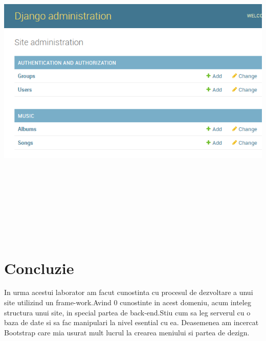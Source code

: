 \documentclass[a4paper, 12pt]{article}
\begin{document}
\includegraphics*[width=15cm, height=16cm]{admin}

\newpage
\section{Concluzie}
In urma acestui laborator am facut cunostinta cu procesul de dezvoltare a unui site utilizind un frame-work.Avind 0 cunostinte in acest domeniu, acum inteleg structura unui site, in special partea de back-end.Stiu cum sa leg serverul cu o baza de date si sa fac manipulari la nivel esential cu ea.
Deasemenea am incercat Bootstrap care mia usurat mult lucrul la crearea meniului si partea de dezign.
\clearpage
\end{document}
